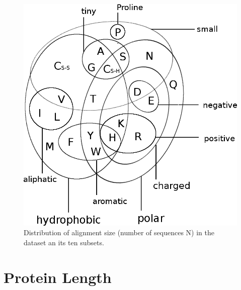 \documentclass[12pt,a4paper,twoside]{book}
\theoremstyle{definition}
\theoremstyle{definition}
\theoremstyle{remark}
\begin{document}
\begin{figure}
\includegraphics[width=1\linewidth]{img/amino_acid_physico_chemical_properties_venn_diagramm} \caption{Distribution of alignment size (number of
sequences N) in the dataset an its ten subsets.}\label{fig:dataset-alignment-size}
\end{figure}

\section{Protein Length}\label{protein-length}
\end{document}
